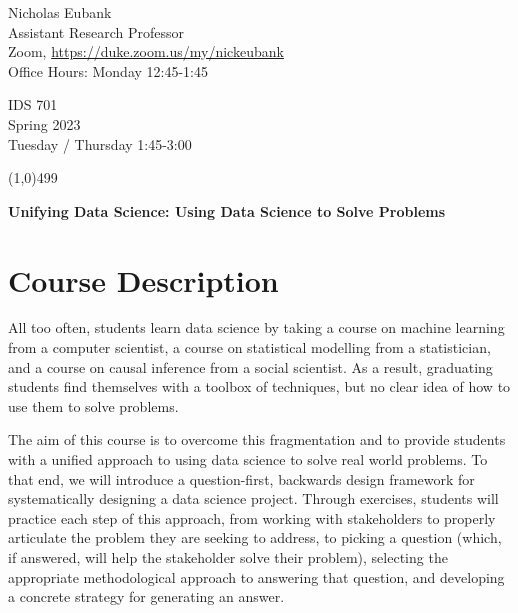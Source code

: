 \documentclass[12pt]{article}
\begin{document}
\singlespacing






\thispagestyle{empty}
\begin{minipage}[t]{.5\textwidth}
	Nicholas Eubank \\
	 Assistant Research Professor\\
	 Zoom, \url{https://duke.zoom.us/my/nickeubank} \\
	 Office Hours: Monday 12:45-1:45
     \vspace*{0.1cm}
\end{minipage}
\begin{minipage}[t]{.5\textwidth}
	\begin{flushright}  IDS 701 \\
	Spring 2023\\
	Tuesday / Thursday 1:45-3:00 
    \vspace*{0.1cm}
\end{flushright}
\end{minipage}


\line(1,0){499}

\vspace{.35in}

\begin{center}
	\textbf{\LARGE{Unifying Data Science: Using Data Science to Solve Problems} }
\end{center}








\section{Course Description}

All too often, students learn data science by taking a course on machine learning from a computer scientist, a course on statistical modelling from a statistician, and a course on causal inference from a social scientist. As a result, graduating students find themselves with a toolbox of techniques, but no clear idea of how to use them to solve problems.

The aim of this course is to overcome this fragmentation and to provide students with a unified approach to using data science to solve real world problems. To that end, we will introduce a question-first, backwards design framework for systematically designing a data science project. Through exercises, students will practice each step of this approach, from working with stakeholders to properly articulate the problem they are seeking to address, to picking a question (which, if answered, will help the stakeholder solve their problem), selecting the appropriate methodological approach to answering that question, and developing a concrete strategy for generating an answer.
\end{document}
